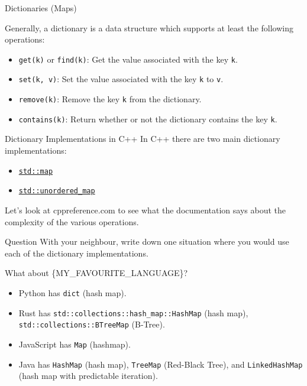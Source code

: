 \documentclass{algo}
\begin{document}
\begin{frame}{Dictionaries (Maps)}

    Generally, a dictionary is a data structure which supports at least the
    following operations:

    \begin{itemize}
        \item \texttt{get(k)} or \texttt{find(k)}: Get the value associated with
            the key \texttt{k}.
        \item \texttt{set(k, v)}: Set the value associated with the key
            \texttt{k} to \texttt{v}.
        \item \texttt{remove(k)}: Remove the key \texttt{k} from the dictionary.
        \item \texttt{contains(k)}: Return whether or not the dictionary
            contains the key \texttt{k}.
    \end{itemize}

\end{frame}

\begin{frame}{Dictionary Implementations in C++}
    In C++ there are two main dictionary implementations:

    \begin{itemize}
        \item \href{https://en.cppreference.com/w/cpp/container/map}{\texttt{std::map}}
        \item \href{https://en.cppreference.com/w/cpp/container/unordered_map}{\texttt{std::unordered\_map}}
    \end{itemize}

    Let's look at cppreference.com to see what the documentation says about the
    complexity of the various operations.

    \pause

    \begin{block}{Question}
        With your neighbour, write down one situation where you would use each
        of the dictionary implementations.
    \end{block}
\end{frame}

\begin{frame}{What about \{MY\_FAVOURITE\_LANGUAGE\}?}
    \begin{itemize}
        \item Python has \texttt{dict} (hash map).
        \item Rust has \texttt{std::collections::hash\_map::HashMap} (hash map),
            \texttt{std::collections::BTreeMap} (B-Tree).
        \item JavaScript has \texttt{Map} (hashmap).
        \item Java has \texttt{HashMap} (hash map),
            \texttt{TreeMap} (Red-Black Tree), and
            \texttt{LinkedHashMap} (hash map with predictable iteration).
    \end{itemize}
\end{frame}
\end{document}
